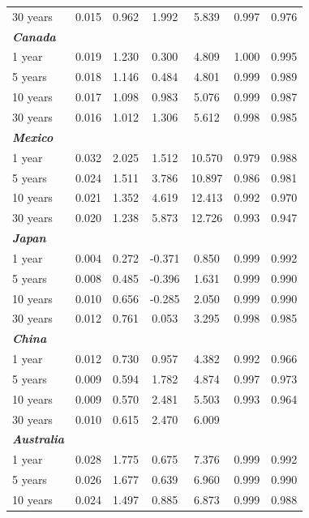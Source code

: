 \documentclass[12pt,bibliography=totoc]{article}
\begin{document}
\begin{appendices}
\begin{table}[H]
\begin{tabular}{l c c c c c c}
30 years	&	0.015	&	0.962	&	1.992	&	5.839	&	0.997	&	0.976	\\
\textbf{\textit{Canada}}	&		&		&		&		&		&		\\
1 year	&	0.019	&	1.230	&	0.300	&	4.809	&	1.000	&	0.995	\\
5 years	&	0.018	&	1.146	&	0.484	&	4.801	&	0.999	&	0.989	\\
10 years	&	0.017	&	1.098	&	0.983	&	5.076	&	0.999	&	0.987	\\
												
30 years	&	0.016	&	1.012	&	1.306	&	5.612	&	0.998	&	0.985	\\
\textbf{\textit{Mexico}}	&		&		&		&		&		&		\\
1 year	&	0.032	&	2.025	&	1.512	&	10.570	&	0.979	&	0.988	\\
5 years	&	0.024	&	1.511	&	3.786	&	10.897	&	0.986	&	0.981	\\
10 years	&	0.021	&	1.352	&	4.619	&	12.413	&	0.992	&	0.970	\\

30 years	&	0.020	&	1.238	&	5.873	&	12.726	&	0.993	&	0.947	\\
\textbf{\textit{Japan}}	&		&		&		&		&		&		\\
1 year	&	0.004	&	0.272	&	-0.371	&	0.850	&	0.999	&	0.992	\\
5 years	&	0.008	&	0.485	&	-0.396	&	1.631	&	0.999	&	0.990	\\
10 years	&	0.010	&	0.656	&	-0.285	&	2.050	&	0.999	&	0.990	\\
												
30 years	&	0.012	&	0.761	&	0.053 	&	3.295	&	0.998	&	0.985	\\
\textbf{\textit{China}}	&		&		&		&		&		&		\\
1 year	&	0.012	&	0.730	&	0.957	&	4.382	&	0.992	&	0.966	\\
5 years	&	0.009	&	0.594	&	1.782	&	4.874	&	0.997	&	0.973	\\
10 years	&	0.009	&	0.570	&	2.481	&	5.503	&	0.993	&	0.964	\\
												
30 years	&	0.010	&	0.615	&	2.470	&	6.009	&		&		\\
\textbf{\textit{Australia}}	&		&		&		&		&		&		\\
1 year	&	0.028	&	1.775	&	0.675	&	7.376	&	0.999	&	0.992	\\
5 years	&	0.026	&	1.677	&	0.639	&	6.960	&	0.999	&	0.990	\\
10 years	&	0.024	&	1.497	&	0.885	&	6.873	&	0.999	&	0.988	\\
												

\end{tabular}
\end{table}
\end{appendices}
\end{document}
